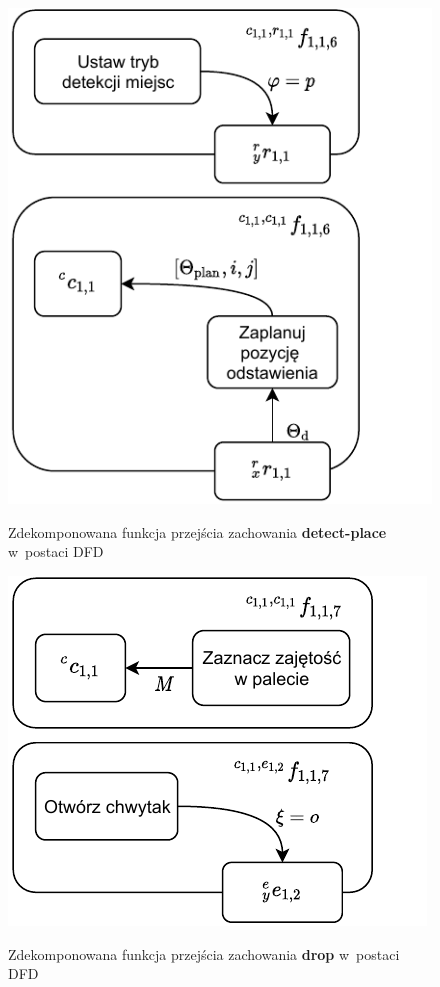 \begin{figure}
    \centering
    \includegraphics[width=\columnwidth]{figures/ISR-cs-fp-detect-place.pdf}
    \label{fig:cs-fp-detect-place}
    \caption{Zdekomponowana funkcja przejścia zachowania \textbf{detect-place} w~postaci DFD}
\end{figure}

\begin{figure}
    \centering
    \includegraphics[width=\columnwidth]{figures/ISR-cs-fp-drop.pdf}
    \label{fig:cs-fp-drop}
    \caption{Zdekomponowana funkcja przejścia zachowania \textbf{drop} w~postaci DFD}
\end{figure}